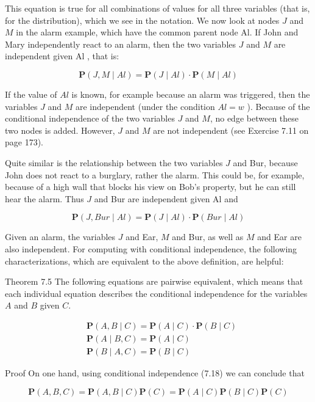\documentclass[10pt]{article}
\begin{document}
This equation is true for all combinations of values for all three variables (that is, for the distribution), which we see in the notation. We now look at nodes $J$ and $M$ in the alarm example, which have the common parent node Al. If John and Mary independently react to an alarm, then the two variables $J$ and $M$ are independent given Al , that is:

$$
\boldsymbol{P}(J, M \mid A l)=\boldsymbol{P}(J \mid A l) \cdot \boldsymbol{P}(M \mid A l)
$$

If the value of $A l$ is known, for example because an alarm was triggered, then the variables $J$ and $M$ are independent (under the condition $A l=w$ ). Because of the conditional independence of the two variables $J$ and $M$, no edge between these two nodes is added. However, $J$ and $M$ are not independent (see Exercise 7.11 on page 173).

Quite similar is the relationship between the two variables $J$ and Bur, because John does not react to a burglary, rather the alarm. This could be, for example, because of a high wall that blocks his view on Bob's property, but he can still hear the alarm. Thus $J$ and Bur are independent given Al and

$$
\boldsymbol{P}(J, B u r \mid A l)=\boldsymbol{P}(J \mid A l) \cdot \boldsymbol{P}(B u r \mid A l)
$$

Given an alarm, the variables $J$ and Ear, $M$ and Bur, as well as $M$ and Ear are also independent. For computing with conditional independence, the following characterizations, which are equivalent to the above definition, are helpful:

Theorem 7.5 The following equations are pairwise equivalent, which means that each individual equation describes the conditional independence for the variables $A$ and $B$ given $C$.


\begin{align*}
& \boldsymbol{P}(A, B \mid C)=\boldsymbol{P}(A \mid C) \cdot \boldsymbol{P}(B \mid C)  \tag{7.18}\\
& \boldsymbol{P}(A \mid B, C)=\boldsymbol{P}(A \mid C)  \tag{7.19}\\
& \boldsymbol{P}(B \mid A, C)=\boldsymbol{P}(B \mid C) \tag{7.20}
\end{align*}


Proof On one hand, using conditional independence (7.18) we can conclude that

$$
\boldsymbol{P}(A, B, C)=\boldsymbol{P}(A, B \mid C) \boldsymbol{P}(C)=\boldsymbol{P}(A \mid C) \boldsymbol{P}(B \mid C) \boldsymbol{P}(C)
$$
\end{document}
